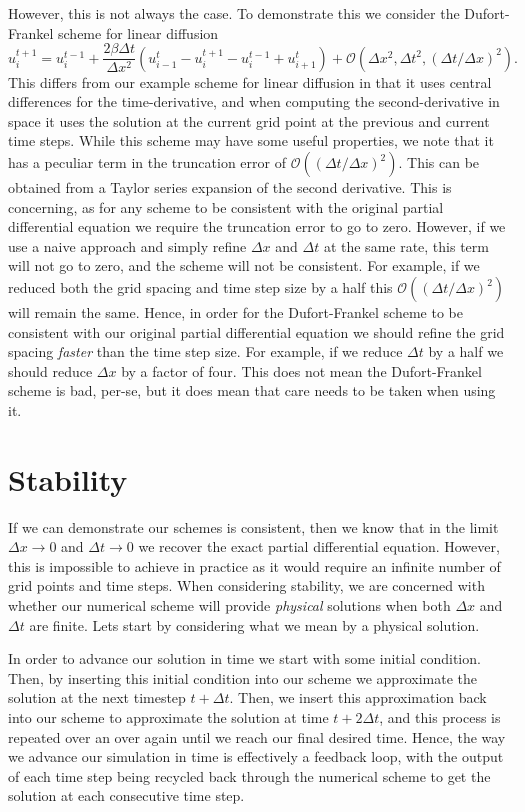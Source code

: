 However, this is not always the case. To demonstrate this we consider the Dufort-Frankel scheme for linear diffusion
\begin{equation}
u_i^{t+1}  = u_{i}^{t-1} + \frac{2 \beta \Delta t}{\Delta x^2} \left(u_{i-1}^t - u_i^{t+1} - u_i^{t-1} + u_{i+1}^t\right) + \mathcal{O}(\Delta x^2,\Delta t^2,(\Delta t/\Delta x)^2).
\end{equation}
This differs from our example scheme for linear diffusion in that it uses central differences for the time-derivative, and when computing the second-derivative in space it uses the solution at the current grid point at the previous and current time steps. While this scheme may have some useful properties, we note that it has a peculiar term in the truncation error of $\mathcal{O}((\Delta t/\Delta x)^2)$. This can be obtained from a Taylor series expansion of the second derivative. This is concerning, as for any scheme to be consistent with the original partial differential equation we require the truncation error to go to zero. However, if we use a naive approach and simply refine $\Delta x$ and $\Delta t$ at the same rate, this term will not go to zero, and the scheme will not be consistent. For example, if we reduced both the grid spacing and time step size by a half this $\mathcal{O}((\Delta t/\Delta x)^2)$ will remain the same. Hence, in order for the Dufort-Frankel scheme to be consistent with our original partial differential equation we should refine the grid spacing {\it faster} than the time step size. For example, if we reduce $\Delta t$ by a half we should reduce $\Delta x$ by a factor of four. This does not mean the Dufort-Frankel scheme is bad, per-se, but it does mean that care needs to be taken when using it.

\section{Stability}
If we can demonstrate our schemes is consistent, then we know that in the limit $\Delta x \rightarrow 0$ and $\Delta t \rightarrow 0$ we recover the exact partial differential equation. However, this is impossible to achieve in practice as it would require an infinite number of grid points and time steps. When considering stability, we are concerned with whether our numerical scheme will provide {\it physical} solutions when both $\Delta x$ and $\Delta t$ are finite. Lets start by considering what we mean by a physical solution.

In order to advance our solution in time we start with some initial condition. Then, by inserting this initial condition into our scheme we approximate the solution at the next timestep $t+\Delta t$. Then, we insert this approximation back into our scheme to approximate the solution at time $t+2\Delta t$, and this process is repeated over an over again until we reach our final desired time. Hence, the way we advance our simulation in time is effectively a feedback loop, with the output of each time step being recycled back through the numerical scheme to get the solution at each consecutive time step. 

